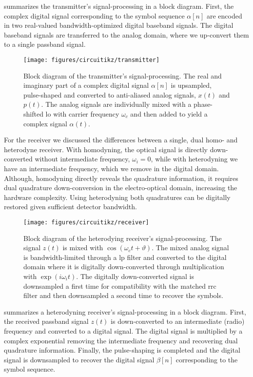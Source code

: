  summarizes the transmitter's signal-processing in a block diagram.
First, the complex digital signal corresponding to the symbol sequence $\alpha[n]$ are encoded in two real-valued bandwidth-optimized digital baseband signals.
The digital baseband signals are transferred to the analog domain, where we up-convert them to a single passband signal.
\begin{figure}[htb]
	\centering
	\texttt{[image: figures/circuitikz/transmitter]}
	\caption{Block diagram of the transmitter's signal-processing. The real and imaginary part of a complex digital signal $\alpha[n]$ is upsampled, pulse-shaped and converted to anti-aliased analog signals, $x(t)$ and $p(t)$. The analog signals are individually mixed with a phase-shifted \gls{lo} with carrier frequency $\omega_c$ and then added to yield a complex signal $\alpha(t)$.}\label{fig:transmitter_signal_processing}
\end{figure}
For the receiver we discussed the differences between a single, dual homo- and heterodyne receiver.
With homodyning, the optical signal is directly down-converted without intermediate frequency, $\omega_i=0$, while with heterodyning we have an intermediate frequency, which we remove in the digital domain.
Although, homodyning directly reveals the quadrature information, it requires dual quadrature down-conversion in the electro-optical domain, increasing the hardware complexity.
Using heterodyning both quadratures can be digitally restored given sufficient detector bandwidth.
\begin{figure}[htb]
	\centering
	\texttt{[image: figures/circuitikz/receiver]}
	\caption{Block diagram of the heterodying receiver's signal-processing. The signal $z(t)$ is mixed with $\cos(\omega_ct+\vartheta)$. The mixed analog signal is bandwidth-limited through a \gls{lp} filter and converted to the digital domain where it is digitally down-converted through multiplication with $\exp(i\omega_it)$. The digitally down-converted signal is downsampled a first time for compatibility with the matched \gls{rrc} filter and then downsampled a second time to recover the symbols.}\label{fig:receiver_signal_processing}
\end{figure}
 summarizes a heterodyning receiver's signal-processing in a block diagram.
First, the received passband signal $z(t)$ is down-converted to an intermediate (radio) frequency and converted to a digital signal.
The digital signal is multiplied by a complex exponential removing the intermediate frequency and recovering dual quadrature information.
Finally, the pulse-shaping is completed and the digital signal is downsampled to recover the digital signal $\beta[n]$ corresponding to the symbol sequence.

